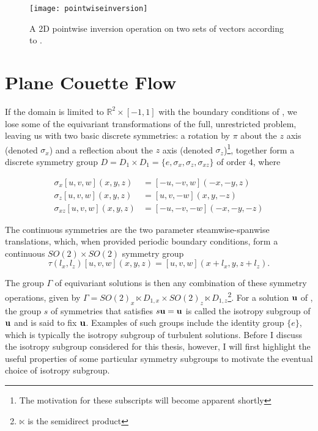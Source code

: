 \begin{figure}[h]
\texttt{[image: pointwiseinversion]}
\caption{A 2D pointwise inversion operation on two sets of vectors according to .}\label{fig:pointwiseinversion}

\end{figure}


\section{Plane Couette Flow}

If the domain is limited to $\mathbb{R}^2 \times [-1,1]$ with the boundary conditions of \pCf, we lose some of the equivariant transformations of the full, unrestricted problem, leaving us with two basic discrete symmetries: a rotation by $\pi$ about the $z$ axis (denoted $\sigma_x$) and a reflection about the $z$ axis (denoted $\sigma_z$)\footnote{The motivation for these subscripts will become apparent shortly}, together form a discrete symmetry group $D = D_1 \times D_1 = \{e, \sigma_x,\sigma_z,\sigma_{xz}\}$ of order 4, where

\begin{align}\label{eq:discretesymm}
\sigma_x [u,v,w](x,y,z) &= [-u,-v,w](-x,-y,z)\\
\sigma_z [u,v,w](x,y,z) &= [u,v,-w](x,y,-z)\\
\sigma_{xz} [u,v,w](x,y,z) &= [-u,-v,-w](-x,-y,-z)
\end{align}

The continuous symmetries are the two parameter steamwise-spanwise translations, which, when provided periodic boundary conditions, form a continuous $SO(2)\times SO(2)$ symmetry group 
\begin{equation}\label{eq:contsymm}
\tau(l_x,l_z)[u,v,w](x,y,z) = [u,v,w](x+l_x,y,z+l_z).
\end{equation}

The group $\Gamma$ of equivariant solutions is then any combination of these symmetry operations, given by $\Gamma = SO(2)_x \ltimes D_{1,x} \times SO(2)_z \ltimes D_{1,z}$\footnote{$\ltimes$ is the semidirect product}. For a solution $\mathbf{u}$ of \pCf, the group $s$ of symmetries that satisfies $s\mathbf{u} = \mathbf{u}$ is called the isotropy subgroup of $\mathbf{u}$ and is said to fix $\mathbf{u}$. Examples of such groups include the identity group $\{e\}$, which is typically the isotropy subgroup of turbulent solutions. Before I discuss the isotropy subgroup considered for this thesis, however, I will first highlight the useful properties of some particular symmetry subgroups to motivate the eventual choice of isotropy subgroup. 

